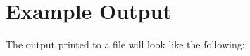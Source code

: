 \chapter{Example Output}\label{ch:example_output} %

The output printed to a file will look like the following:

